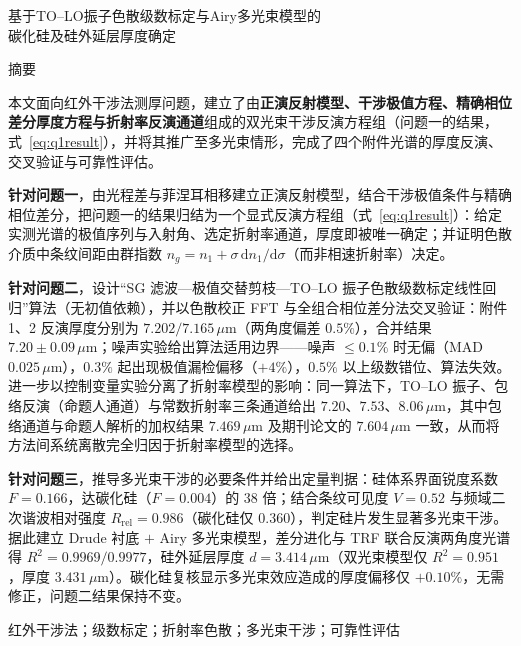 \documentclass[11pt,a4paper,fontset=fandol]{ctexart}
\newcommand{\um}{\,\mu\mathrm{m}}
\begin{document}
\begin{center}
    {\heiti 基于TO--LO振子色散级数标定与Airy多光束模型的\\[0.2em]碳化硅及硅外延层厚度确定}
\end{center}

\begin{center}
    {\heiti 摘\quad 要}
\end{center}

本文面向红外干涉法测厚问题，建立了由\textbf{正演反射模型、干涉极值方程、精确相位差分厚度方程与折射率反演通道}组成的双光束干涉反演方程组（问题一的结果，式~\eqref{eq:q1result}），并将其推广至多光束情形，完成了四个附件光谱的厚度反演、交叉验证与可靠性评估。

\textbf{针对问题一}，由光程差与菲涅耳相移建立正演反射模型，结合干涉极值条件与精确相位差分，把问题一的结果归结为一个显式反演方程组（式~\eqref{eq:q1result}）：给定实测光谱的极值序列与入射角、选定折射率通道，厚度即被唯一确定；并证明色散介质中条纹间距由群指数 $n_g=n_1+\sigma\,\mathrm{d}n_1/\mathrm{d}\sigma$（而非相速折射率）决定。

\textbf{针对问题二}，设计``SG 滤波---极值交替剪枝---TO--LO 振子色散级数标定线性回归''算法（无初值依赖），并以色散校正 FFT 与全组合相位差分法交叉验证：附件 1、2 反演厚度分别为 $7.202/7.165\um$（两角度偏差 $0.5\%$），合并结果 $7.20\pm0.09\um$；噪声实验给出算法适用边界——噪声 $\le0.1\%$ 时无偏（MAD $0.025\um$），$0.3\%$ 起出现极值漏检偏移（$+4\%$），$0.5\%$ 以上级数错位、算法失效。进一步以控制变量实验分离了折射率模型的影响：同一算法下，TO--LO 振子、包络反演（命题人通道）与常数折射率三条通道给出 $7.20$、$7.53$、$8.06\um$，其中包络通道与命题人解析\cite{xue2026}的加权结果 $7.469\um$ 及期刊论文\cite{zhu2026}的 $7.604\um$ 一致，从而将方法间系统离散完全归因于折射率模型的选择。

\textbf{针对问题三}，推导多光束干涉的必要条件并给出定量判据：硅体系界面锐度系数 $F=0.166$，达碳化硅（$F=0.004$）的 $38$ 倍；结合条纹可见度 $V=0.52$ 与频域二次谐波相对强度 $R_{\mathrm{rel}}=0.986$（碳化硅仅 $0.360$），判定硅片发生显著多光束干涉。据此建立 Drude 衬底 $+$ Airy 多光束模型，差分进化与 TRF 联合反演两角度光谱得 $R^2=0.9969/0.9977$，硅外延层厚度 $d=3.414\um$（双光束模型仅 $R^2=0.951$，厚度 $3.431\um$）。碳化硅复核显示多光束效应造成的厚度偏移仅 $+0.10\%$，无需修正，问题二结果保持不变。

\vspace{0.6em}
红外干涉法；级数标定；折射率色散；多光束干涉；可靠性评估

\newpage
\end{document}
